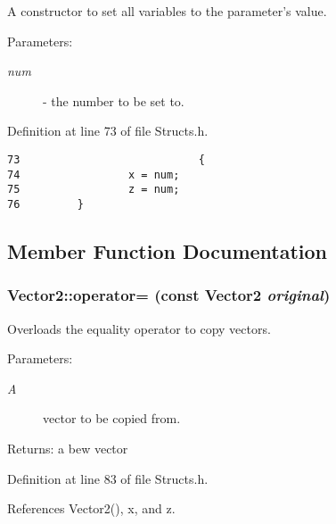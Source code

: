 A constructor to set all variables to the parameter's value. 

\begin{Desc}
\item[Parameters:]
\begin{description}
\item[{\em num}]- the number to be set to. \end{description}
\end{Desc}


Definition at line 73 of file Structs.h.

\begin{Code}\begin{verbatim}73                            {
74                 x = num;
75                 z = num;
76         }
\end{verbatim}
\end{Code}




\subsection{Member Function Documentation}
\hypertarget{struct_vector2_3d1d26225e42356584a90f6c61e86b17}{
\subsubsection[operator=]{ Vector2::operator= (const {\bf Vector2} {\em original})}}
\label{struct_vector2_3d1d26225e42356584a90f6c61e86b17}


Overloads the equality operator to copy vectors. 

\begin{Desc}
\item[Parameters:]
\begin{description}
\item[{\em A}]vector to be copied from. \end{description}
\end{Desc}
\begin{Desc}
\item[Returns:]a bew vector \end{Desc}


Definition at line 83 of file Structs.h.

References Vector2(), x, and z.

